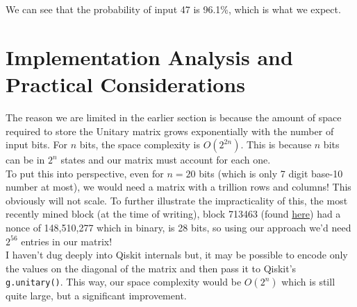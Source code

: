 \documentclass[11pt]{article} %
\begin{document}
We can see that the probability of input 47 is 96.1\%, which is what we expect.

\section{Implementation Analysis and Practical Considerations}{}
The reason we are limited in the earlier section is because the amount of space required to store the Unitary matrix grows exponentially with the number of input bits. For $n$ bits, the space complexity is $O(2^{2n})$. This is because $n$ bits can be in $2^{n}$ states and our matrix must account for each one. \\

\noindent To put this into perspective, even for $n = 20$ bits (which is only 7 digit base-10 number at most), we would need a matrix with a trillion rows and columns! This obviously will not scale. To further illustrate the impracticality of this, the most recently mined block (at the time of writing), block 713463 (found \href{https://www.blockchain.com/btc/block/713463}{here}) had a nonce of 148,510,277 which in binary, is 28 bits, so using our approach we'd need $2^{56}$ entries in our matrix!\\

\noindent I haven't dug deeply into Qiskit internals but, it may be possible to encode only the values on the diagonal of the matrix and then pass it to Qiskit's \lstinline{g.unitary()}. This way, our space complexity would be $O(2^n)$ which is still quite large, but a significant improvement.
\end{document}

